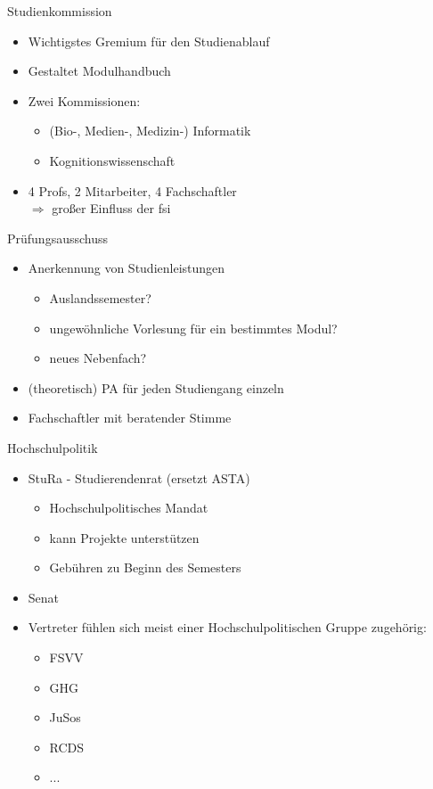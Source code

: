 \documentclass{beamer}
\begin{document}
	\begin{frame}{Studienkommission}
		\begin{itemize}
			\item Wichtigstes Gremium für den Studienablauf
			\item Gestaltet Modulhandbuch
			\item Zwei Kommissionen:
				\begin{itemize}
					\item (Bio-, Medien-, Medizin-) Informatik
					\item Kognitionswissenschaft
				\end{itemize}
			\item 4 Profs, 2 Mitarbeiter, 4 Fachschaftler\\
				$\Rightarrow$ großer Einfluss der fsi
		\end{itemize}
	\end{frame}

	\begin{frame}{Prüfungsausschuss}
		\begin{itemize}
			\item Anerkennung von Studienleistungen
				\begin{itemize}
					\item Auslandssemester?
					\item ungewöhnliche Vorlesung für ein bestimmtes Modul?
					\item neues Nebenfach?
				\end{itemize}
			\item (theoretisch) PA für jeden Studiengang einzeln
			\item Fachschaftler mit beratender Stimme
		\end{itemize}
	\end{frame}

	\begin{frame}{Hochschulpolitik}
		\begin{itemize}
			\item StuRa - Studierendenrat (ersetzt ASTA)
				\begin{itemize}
					\item Hochschulpolitisches Mandat
					\item kann Projekte unterstützen
					\item Gebühren zu Beginn des Semesters
				\end{itemize}
			\item Senat
			\item Vertreter fühlen sich meist einer Hochschulpolitischen Gruppe zugehörig:
				\begin{itemize}
					\item FSVV
					\item GHG
					\item JuSos
					\item RCDS
					\item ...
				\end{itemize}
		\end{itemize}
	\end{frame}
\end{document}
